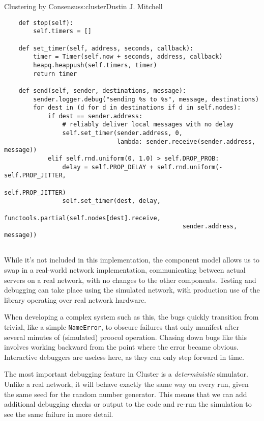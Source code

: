 \begin{aosachapter}{Clustering by Consensus}{s:cluster}{Dustin J. Mitchell}
\begin{verbatim}
    def stop(self):
        self.timers = []

    def set_timer(self, address, seconds, callback):
        timer = Timer(self.now + seconds, address, callback)
        heapq.heappush(self.timers, timer)
        return timer

    def send(self, sender, destinations, message):
        sender.logger.debug("sending %s to %s", message, destinations)
        for dest in (d for d in destinations if d in self.nodes):
            if dest == sender.address:
                # reliably deliver local messages with no delay
                self.set_timer(sender.address, 0,  
                               lambda: sender.receive(sender.address, message))
            elif self.rnd.uniform(0, 1.0) > self.DROP_PROB:
                delay = self.PROP_DELAY + self.rnd.uniform(-self.PROP_JITTER, 
                                                           self.PROP_JITTER)
                self.set_timer(dest, delay, 
                               functools.partial(self.nodes[dest].receive, 
                                                 sender.address, message))
    
\end{verbatim}

While it's not included in this implementation, the component model
allows us to swap in a real-world network implementation, communicating
between actual servers on a real network, with no changes to the other
components. Testing and debugging can take place using the simulated
network, with production use of the library operating over real network
hardware.

\label{debugging-support}

When developing a complex system such as this, the bugs quickly
transition from trivial, like a simple \texttt{NameError}, to obscure
failures that only manifest after several minutes of (simulated) proocol
operation. Chasing down bugs like this involves working backward from
the point where the error became obvious. Interactive debuggers are
useless here, as they can only step forward in time.

The most important debugging feature in Cluster is a
\emph{deterministic} simulator. Unlike a real network, it will behave
exactly the same way on every run, given the same seed for the random
number generator. This means that we can add additional debugging checks
or output to the code and re-run the simulation to see the same failure
in more detail.


\end{aosachapter}
